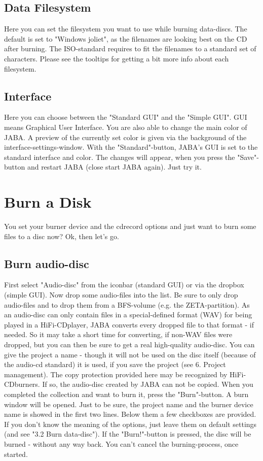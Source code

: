 \documentclass[a4paper,11pt]{article}
\begin{document}
\subsection{Data Filesystem}

Here you can set the filesystem you want to use while burning data-discs.
The default is set to "Windows joliet", as the filenames are looking best on the CD after
burning.
The ISO-standard requires to fit the filenames to a standard set of characters.
Please see the tooltips for getting a bit more info about each filesystem.

\subsection{Interface}

Here you can choose between the "Standard GUI" and the "Simple GUI". GUI means
Graphical User Interface.
You are also able to change the main color of JABA. A preview of the currently set
color is given via the background of the interface-settings-window.
With the "Standard"-button, JABA's GUI is set to the standard interface and color.
The changes will appear, when you press the "Save"-button and restart JABA (close
start JABA again).
Just try it.

\section{Burn a Disk}

You set your burner device and the cdrecord options and just want to burn some files to
a disc now? Ok, then let's go.

\subsection{Burn audio-disc}

First select "Audio-disc" from the iconbar (standard GUI) or via the dropbox (simple
GUI).
Now drop some audio-files into the list. Be sure to only drop audio-files and to drop
them from a BFS-volume (e.g. the ZETA-partition).
As an audio-disc can only contain files in a special-defined format (WAV) for being
played in a HiFi-CDplayer, JABA converts every dropped file to that format - if needed.
So it may take a short time for converting, if non-WAV files were dropped, but you can
then be sure to get a real high-quality audio-disc.
You can give the project a name - though it will not be used on the disc itself (because
of the audio-cd standard) it is used, if you save the project (see 6. Project management).
The copy protection provided here may be recognized by HiFi-CDburners. If so, the
audio-disc created by JABA can not be copied.
When you completed the collection and want to burn it, press the "Burn"-button. A burn
window will be opened.
Just to be sure, the project name and the burner device name is showed in the first two
lines. Below them a few checkboxes are provided.
If you don't know the meaning of the options, just leave them on default settings (and
see "3.2 Burn data-disc").
If the "Burn!"-button is pressed, the disc will be burned - without any way back. You
can't cancel the burning-process, once started.
\end{document}
